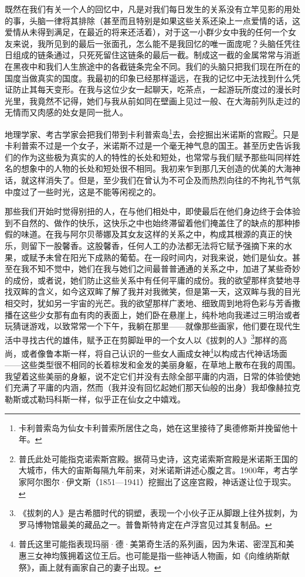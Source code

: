 \par 既然在我们有关一个人的回忆中，凡是对我们每日发生的关系没有立竿见影的用处的事，头脑一律将其排除（甚至而且特别是如果这些关系还染上一点爱情的话，这爱情从未得到满足，在最近的将来还活着），对于这一小群少女中我的任何一个女友来说，我所见到的最后一张面孔，怎么能不是我回忆的唯一面庞呢？头脑任凭往日组成的链条通过，只死死留住这链条的最后一截。制成这一截的金属常常与消逝在黑夜中和我们人生旅途中的各截链条完全不同。我们的头脑只把我们现在所在的国度当做真实的国度。我最初的印象已经那样遥远，在我的记忆中无法找到什么凭证防止其每天变形。在我与这位少女一起聊天，吃茶点，一起游玩所度过的漫长时光里，我竟然不记得，她们与我从前如同在壁画上见过一般、在大海前列队走过的无情而又肉感的处女是同一批人。
\par 地理学家、考古学家会把我们带到卡利普索岛\footnote{卡利普索岛为仙女卡利普索所居住之岛，她在这里接待了奥德修斯并挽留他十年。}去，会挖掘出米诺斯的宫殿\footnote{普氏此处可能指克诺索斯宫殿。据荷马史诗，这克诺索斯宫殿是米诺斯王国的大城市，伟大的宙斯每隔九年前来，对米诺斯讲述心腹之言。1900年，考古学家阿尔图尔·伊文斯（1851—1941）挖掘出了这座宫殿，神话遂让位于现实。}。只是卡利普索不过是一个女子，米诺斯不过是一个毫无神气息的国王。甚至历史告诉我们的作为这些极为真实的人的特性的长处和短处，也常常与我们赋予那些叫同样姓名的想象中的人物的长处和短处很不相同。我初来乍到那几天创造的优美的大海神话，就这样消失了。但是，至少我们在曾认为不可企及而热烈向往的不拘礼节气氛中度过了一些时光，这是不能等闲视之的。
\par 那些我们开始时觉得别扭的人，在与他们相处中，即使最后在他们身边终于会体验到不自然的、做作的快乐，这快乐之中也始终滞留着他们掩盖住了的缺点的那种掺假的味道。在我与阿尔贝蒂娜及其女友这样的关系之中，构成其根源的真正的快乐，则留下一股馨香。这股馨香，任何人工的办法都无法将它赋予强摘下来的水果，或赋予未曾在阳光下成熟的葡萄。在一段时间内，对我来说，她们是仙女。甚至在我不知不觉中，她们在我与她们之间最普普通通的关系之中，加进了某些奇妙的成份，或者说，她们防止这些关系中有任何平庸的成份。我的欲望那样贪婪地寻找双眸的含义，如今这双眸了解了我并对我微笑，但是第一天，这双眸与我的目光相交时，犹如另一宇宙的光芒。我的欲望那样广袤地、细致周到地将色彩与芳香撒播在这些少女那有血有肉的表面上，她们卧在悬崖上，纯朴地向我递过三明治或者玩猜谜游戏，以致常常一个下午，我躺在那里——就像那些画家，他们要在现代生活中寻找古代的雄伟，赋予正在剪脚趾甲的一个女人以《拔刺的人》\footnote{《拔刺的人》是古希腊时代的铜塑，表现一个小伙子正从脚跟上往外拔刺，为罗马博物馆最美的藏品之一。普鲁斯特肯定在卢浮宫见过其复制品。}那样的高尚，或者像鲁本斯一样，将自己认识的一些女人画成女神\footnote{普氏这里可能指表现玛丽·德·美第奇生活的系列画，因为朱诺、密涅瓦和美惠三女神均簇拥着这位王后。也可能是指一些神话人物画，如《向维纳斯献祭》，画上就有画家自己的妻子出现。}以构成古代神话场面——这些类型很不相同的长着棕发和金发的美丽身躯，在草地上散布在我的周围。我望着这些美丽的身躯，说不定它们并没有去除全部平庸的内涵，日常的体验使她们充满了平庸的内涵，然而（我并没有回忆起她们那天仙般的出身）我却像赫拉克勒斯或忒勒玛科斯一样，似乎正在仙女之中嬉戏。

